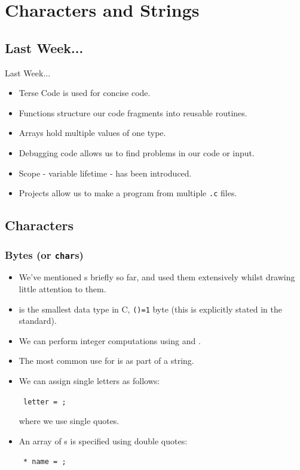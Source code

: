 \documentclass[smaller,table]{beamer}
\subtitle{Lecture 3 of 5}
\begin{document}
{
\begin{frame}
  \titlepage
\end{frame}
}


\section{Characters and Strings}
\subsection{Last Week...}
\begin{frame}{Last Week...}
\begin{itemize}
\item Terse Code is used for concise code.
\item Functions structure our code fragments into reusable routines.
\item Arrays hold multiple values of one type.
\item Debugging code allows us to find problems in our code or input.
\item Scope - variable lifetime - has been introduced.
\item Projects allow us to make a program from multiple \texttt{.c} files.
\end{itemize}
\end{frame}


\subsection{Characters}
\begin{frame}
\frametitle{Bytes (or {\tt char}s)}
\begin{itemize}
\item We've mentioned {\tt {}}s briefly so far, and used them extensively whilst drawing little attention to them.
\item {\tt {}} is the smallest data type in C, {\tt {}()=1} byte (this is explicitly stated in the standard).
\item We can perform integer computations using {\tt {}} and {\tt {}}.
\item The most common use for {\tt {}} is as part of a string.
\item We can assign single letters as follows:
\begin{center}
{\tt {} letter = ;}
\end{center}
where we use single quotes.
\item An array of {\tt {}}s is specified using double quotes:
\begin{center}
\tt {} * name = ;
\end{center}
\end{itemize}
\end{frame}
\end{document}
